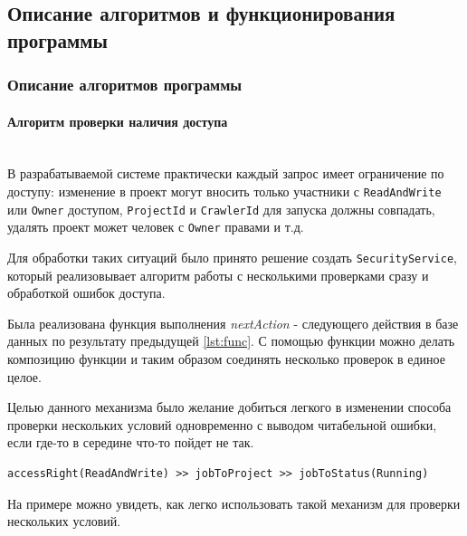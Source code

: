 \documentclass[a4paper,12pt]{article}
\begin{document}
    
	
	\subsection{Описание алгоритмов и функционирования программы}
	\subsubsection{Описание алгоритмов программы}
	\paragraph{Алгоритм проверки наличия доступа\\ \\}
	В разрабатываемой системе практически каждый запрос имеет ограничение по доступу: изменение в проект могут вносить только участники с \texttt{ReadAndWrite} или \texttt{Owner} доступом, \texttt{ProjectId} и \texttt{CrawlerId} для запуска должны совпадать, удалять проект может человек с \texttt{Owner} правами и т.д.
	
	Для обработки таких ситуаций было принято решение создать \texttt{SecurityService}, который реализовывает алгоритм работы с несколькими проверками сразу и обработкой ошибок доступа.
	
	Была реализована функция выполнения \textit{nextAction} - следующего действия в базе данных по результату предыдущей \ref{lst:func}. С помощью функции  можно делать композицию функции и таким образом соединять несколько проверок в единое целое. \cite{flatmap} 
	
	Целью данного механизма было желание добиться легкого в изменении способа проверки нескольких условий одновременно с выводом читабельной ошибки, если где-то в середине что-то пойдет не так.
	
	\begin{lstlisting}[frame=single, basicstyle=\footnotesize\ttfamily, label={lst:func}, caption={Нестинг функций},captionpos=b]
        accessRight(ReadAndWrite) >> jobToProject >> jobToStatus(Running) 
	\end{lstlisting}
	
	На примере  можно увидеть, как легко использовать такой механизм для проверки нескольких условий.
	
\end{document}
